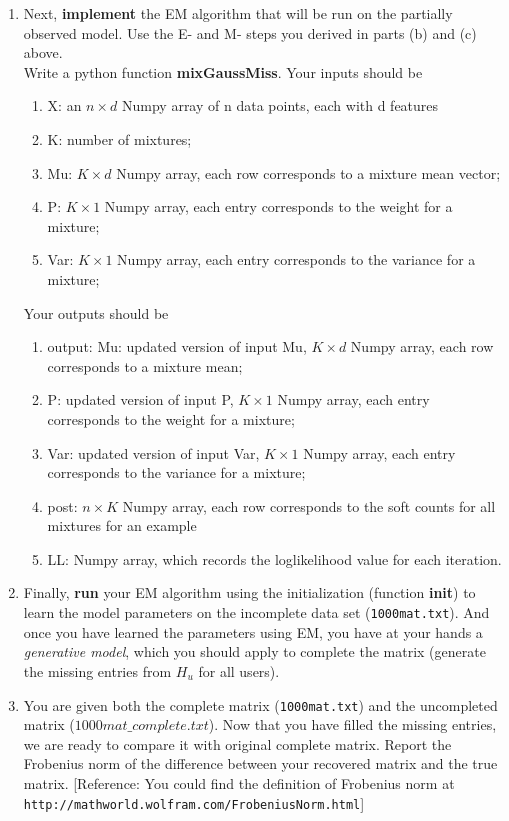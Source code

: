 \begin{enumerate}
\begin{enumerate}
\item Next, \textbf{implement} the EM algorithm that will be run on the partially observed model. Use the E- and M- steps you derived in parts (b) and (c) above.\\
    Write a python function \textbf{mixGaussMiss}. Your inputs should be
    \begin{enumerate}
    \item X: an $n \times d$ Numpy array of n data points, each with d features
    \item K: number of mixtures; 
    \item Mu: $K \times d$ Numpy array, each row corresponds to a mixture mean vector;
    \item P: $K \times 1$ Numpy array, each entry corresponds to the weight for a mixture;
    \item Var: $K \times 1$ Numpy array, each entry corresponds to the variance for a mixture;
    \end{enumerate}
    Your outputs should be
    \begin{enumerate}
    \item output: Mu: updated version of input Mu, $K \times d$ Numpy array, each row corresponds to a mixture mean;
    \item P: updated version of input P, $K \times 1$ Numpy array, each entry corresponds to the weight for a mixture;
    \item Var: updated version of input Var, $K \times 1$ Numpy array, each entry corresponds to the variance for a mixture;
    \item post: $n \times K$ Numpy array, each row corresponds to the soft counts for all mixtures for an example
    \item LL: Numpy array, which records the loglikelihood value for each iteration.
    \end{enumerate}
\item Finally, \textbf{run} your EM algorithm using the initialization (function \textbf{init}) to learn the model parameters on the incomplete data set (\texttt{1000mat.txt}). And once you have learned the parameters using EM, you have at your hands a \emph{generative model}, which you should apply to complete the matrix (generate the missing entries from $H_u$ for all users).

\item You are given both the complete matrix (\texttt{1000mat.txt}) and the uncompleted matrix (\texttt{$1000mat\_complete.txt$}). Now that you have filled the missing entries, we are ready to compare it with original complete matrix. Report the Frobenius norm of the difference between your recovered matrix and the true matrix.
[Reference: You could find the definition of Frobenius norm at \texttt{http://mathworld.wolfram.com/FrobeniusNorm.html}]

\end{enumerate}


\end{enumerate}






